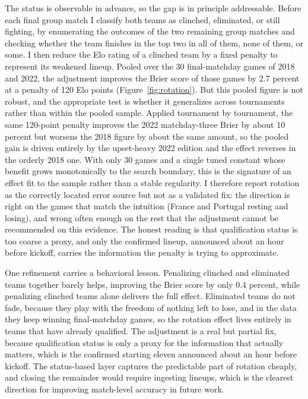 \documentclass[11pt,a4paper]{article}
\begin{document}
The status is observable in advance, so the gap is in principle addressable. Before each final group match I classify both teams as clinched, eliminated, or still fighting, by enumerating the outcomes of the two remaining group matches and checking whether the team finishes in the top two in all of them, none of them, or some. I then reduce the Elo rating of a clinched team by a fixed penalty to represent its weakened lineup. Pooled over the 30 final-matchday games of 2018 and 2022, the adjustment improves the Brier score of those games by 2.7 percent at a penalty of 120 Elo points (Figure~\ref{fig:rotation}). But this pooled figure is not robust, and the appropriate test is whether it generalizes across tournaments rather than within the pooled sample. Applied tournament by tournament, the same 120-point penalty improves the 2022 matchday-three Brier by about 10 percent but worsens the 2018 figure by about the same amount, so the pooled gain is driven entirely by the upset-heavy 2022 edition and the effect reverses in the orderly 2018 one. With only 30 games and a single tuned constant whose benefit grows monotonically to the search boundary, this is the signature of an effect fit to the sample rather than a stable regularity. I therefore report rotation as the correctly located error source but not as a validated fix: the direction is right on the games that match the intuition (France and Portugal resting and losing), and wrong often enough on the rest that the adjustment cannot be recommended on this evidence. The honest reading is that qualification status is too coarse a proxy, and only the confirmed lineup, announced about an hour before kickoff, carries the information the penalty is trying to approximate.

One refinement carries a behavioral lesson. Penalizing clinched and eliminated teams together barely helps, improving the Brier score by only 0.4 percent, while penalizing clinched teams alone delivers the full effect. Eliminated teams do not fade, because they play with the freedom of nothing left to lose, and in the data they keep winning final-matchday games, so the rotation effect lives entirely in teams that have already qualified. The adjustment is a real but partial fix, because qualification status is only a proxy for the information that actually matters, which is the confirmed starting eleven announced about an hour before kickoff. The status-based layer captures the predictable part of rotation cheaply, and closing the remainder would require ingesting lineups, which is the clearest direction for improving match-level accuracy in future work.
\end{document}
